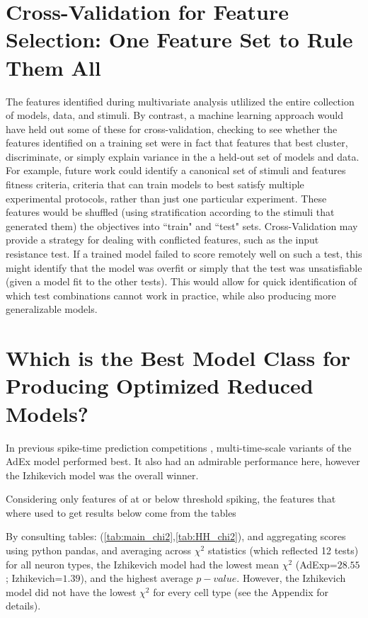 
\section{Cross-Validation for Feature Selection: One Feature Set to Rule Them All}
The features identified during multivariate analysis utlilized the entire collection of models, data, and stimuli.
By contrast, a machine learning approach would have held out some of these for cross-validation, checking to see whether the features identified on a training set were in fact that features that best cluster, discriminate, or simply explain variance in the a held-out set of models and data.
For example, future work could identify a canonical set of stimuli and features fitness criteria, criteria that can train models to best satisfy multiple experimental protocols, rather than just one particular experiment.
These features would be shuffled (using stratification according to the stimuli that generated them) the objectives into ``train" and ``test" sets.
Cross-Validation may provide a strategy for dealing with conflicted features, such as the input resistance test.
If a trained model failed to score remotely well on such a test, this might identify that the model was overfit or simply that the test was unsatisfiable (given a model fit to the other tests).
This would allow for quick identification of which test combinations cannot work in practice, while also producing more generalizable models.

\section{Which is the Best Model Class for Producing Optimized Reduced Models?}
In previous spike-time prediction competitions \citep{incf_multi}, multi-time-scale variants of the AdEx model performed best.
It also had an admirable performance here, however the Izhikevich model was the overall winner.

Considering only features of at or below threshold spiking, the features that where used to get results below come from the tables 

By consulting tables: (\ref{tab:main_chi2},\ref{tab:HH_chi2}), and aggregating scores using python pandas, and averaging across $\chi^{2}$ statistics (which reflected 12 tests) for all neuron types, the Izhikevich model had the lowest mean $\chi^{2}$ (AdExp=$28.55$; Izhikevich=$1.39$), and the highest average $p-value$.
However, the Izhikevich model did not have the lowest $\chi^{2}$ for every cell type (see the Appendix for details).


